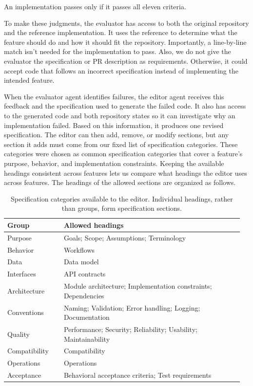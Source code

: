 \documentclass[sigconf,nonacm]{acmart}
\begin{document}
An implementation passes only if it passes all eleven criteria.

To make these judgments, the evaluator has access to both the original repository and the reference implementation. It uses the reference to determine what the feature should do and how it should fit the repository. Importantly, a line-by-line match isn’t needed for the implementation to pass. Also, we do not give the evaluator the specification or PR description as requirements. Otherwise, it could accept code that follows an incorrect specification instead of implementing the intended feature.

When the evaluator agent identifies failures, the editor agent receives this feedback and the specification used to generate the failed code. It also has access to the generated code and both repository states so it can investigate why an implementation failed. Based on this information, it produces one revised specification. The editor can then add, remove, or modify sections, but any section it adds must come from our fixed list of specification categories. These categories were chosen as common specification categories that cover a feature's purpose, behavior, and implementation constraints. Keeping the available headings consistent across features lets us compare what headings the editor uses across features. The headings of the allowed sections are organized as follows.

\begin{table}[t]
\caption{Specification categories available to the editor.
Individual headings, rather than groups, form specification sections.}
\label{tab:specification-categories}
\small
\begin{tabular}{@{}p{0.23\linewidth}p{0.73\linewidth}@{}}
\toprule
Group & Allowed headings \\
\midrule
Purpose & Goals; Scope; Assumptions; Terminology \\
Behavior & Workflows \\
Data & Data model \\
Interfaces & API contracts \\
Architecture & Module architecture; Implementation constraints;
Dependencies \\
Conventions & Naming; Validation; Error handling; Logging;
Documentation \\
Quality & Performance; Security; Reliability; Usability;
Maintainability \\
Compatibility & Compatibility \\
Operations & Operations \\
Acceptance & Behavioral acceptance criteria; Test requirements \\
\bottomrule
\end{tabular}
\end{table}
\end{document}

